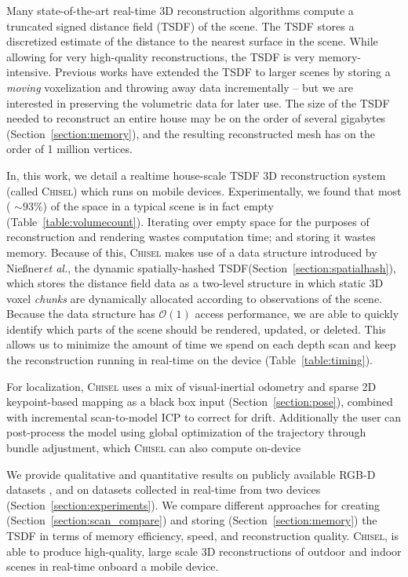 \documentclass[conference]{IEEEtran}
\newcommand{\sref}[1]{Section~\ref{#1}}
\newcommand{\tabref}[1]{Table~\ref{#1}}
\newcommand{\etal}{\textit{et al.}\xspace}
\newcommand{\TSDF}{TSDF\xspace}
\newcommand{\Niessner}{Nie{\ss}ner\xspace}
\newcommand{\chisel}{\textsc{Chisel}\xspace}
\begin{document}
Many state-of-the-art real-time 3D reconstruction algorithms \cite{Newcombe,
Whelan2013,WhelanLoopClose,Bylow2013,NiessnerHashing} compute a truncated
signed distance field (\TSDF) \cite{Curless1996} of the scene. The \TSDF stores a
discretized estimate of the distance to the nearest surface in the scene. While
allowing for very high-quality reconstructions, the \TSDF is very
memory-intensive. Previous works \cite{Whelan2013, WhelanLoopClose} have
extended the \TSDF to larger scenes by storing a \textit{moving} voxelization
and throwing away data incrementally -- but we are interested in preserving the
volumetric data for later use. The size of the \TSDF needed to reconstruct an
entire house may be on the order of several gigabytes  (\sref{section:memory}), and the
resulting reconstructed mesh has on the order of 1 million vertices.  

In, this work, we detail a realtime house-scale \TSDF 3D reconstruction system
(called \chisel) which runs on mobile devices. Experimentally, we found that
most ( $\sim 93\%$) of the space in a typical scene is in fact empty
(\tabref{table:volumecount}). Iterating over empty space for the purposes of
reconstruction and rendering wastes computation time; and storing it wastes
memory. Because of this, \chisel makes use of a data structure introduced by
\Niessner \etal \cite{NiessnerHashing}, the dynamic spatially-hashed
\cite{SpatialHashing} \TSDF (\sref{section:spatialhash}), which stores the
distance field data as a two-level structure in which static 3D voxel
\textit{chunks} are dynamically allocated according to observations of the
scene. Because the data structure has $\mathcal{O}(1)$ access performance, we
are able to quickly identify which parts of the scene should be rendered, 
updated, or deleted. This allows us to minimize the amount of time we spend on
each depth scan and keep the reconstruction running in real-time on the device
(\tabref{table:timing}).

For localization, \chisel uses a mix of  visual-inertial odometry \cite{VINS,
VINS2} and sparse 2D keypoint-based mapping \cite{FastSlam} as a black box input
(\sref{section:pose}), combined with incremental scan-to-model ICP
\cite{BeslICP} to correct for drift. Additionally the user can
post-process the model using global optimization of the trajectory through
bundle adjustment, which \chisel can also compute on-device

 We provide qualitative and  quantitative results on publicly available RGB-D
 datasets \cite{FREIBURG}, and on datasets collected in real-time from two
 devices (\sref{section:experiments}). We compare different approaches for
 creating (\sref{section:scan_compare}) and storing (\sref{section:memory}) the
 \TSDF in terms of memory efficiency, speed, and reconstruction quality.
 \chisel, is able to produce high-quality, large scale 3D reconstructions of
 outdoor and indoor scenes in real-time onboard a mobile device.
\end{document}
